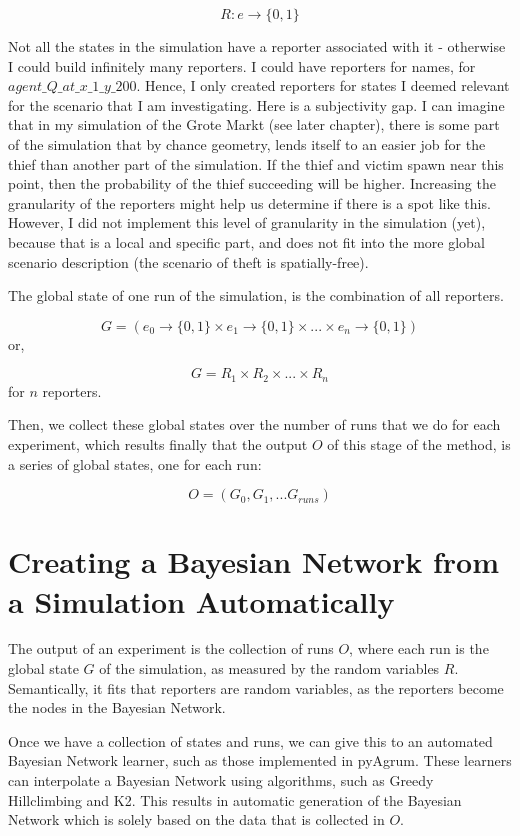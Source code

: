 \[ R : e \rightarrow \{0, 1\} \]

Not all the states in the simulation have a reporter associated with it - otherwise I could build infinitely many reporters. I could have reporters for names, for $agent\_Q\_at\_x\_1\_y\_200$. Hence, I only created reporters for states I deemed relevant for the scenario that I am investigating. Here is a subjectivity gap. I can imagine that in my simulation of the Grote Markt (see later chapter), there is some part of the simulation that by chance geometry, lends itself to an easier job for the thief than another part of the simulation. If the thief and victim spawn near this point, then the probability of the thief succeeding will be higher. Increasing the granularity of the reporters might help us determine if there is a spot like this. However, I did not implement this level of granularity in the simulation (yet), because that is a local and specific part, and does not fit into the more global scenario description (the scenario of theft is spatially-free).

The global state of one run of the simulation, is the combination of all reporters.

\[ G = (e_0 \rightarrow \{0, 1\} \times e_1 \rightarrow \{0, 1\} \times ... \times e_n \rightarrow \{0, 1\})\]
 or,
 
\[ G = R_1 \times R_2 \times... \times R_n\]
for $n$ reporters.

Then, we collect these global states over the number of runs that we do for each experiment, which results finally that the output $O$ of this stage of the method, is a series of global states, one for each run:

\[ O = (G_0, G_1, ... G_{runs})\]


\section{Creating a Bayesian Network from a Simulation Automatically}

The output of an experiment is the collection of runs $O$, where each run is the global state $G$ of the simulation, as measured by the random variables $R$. Semantically, it fits that reporters are random variables, as the reporters become the nodes in the Bayesian Network.

Once we have a collection of states and runs, we can give this to an automated Bayesian Network learner, such as those implemented in pyAgrum. These learners can interpolate a Bayesian Network using algorithms, such as Greedy Hillclimbing and K2. This results in automatic generation of the Bayesian Network which is solely based on the data that is collected in $O$. 


